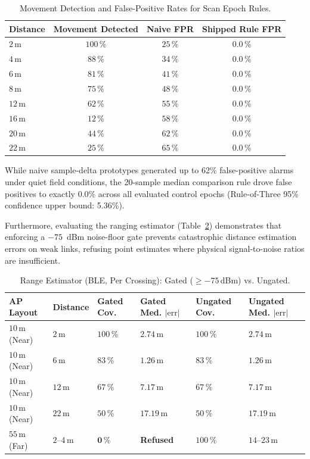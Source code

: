 \documentclass[journal,10pt]{IEEEtran}
\begin{document}
\begin{table}[htb!]
  \centering
  \caption{Movement Detection and False-Positive Rates for Scan Epoch Rules.}
  \label{tab:epoch}
  \footnotesize
  \begin{tabular}{@{}lccc@{}}
    \toprule
    Distance & Movement Detected & Naive FPR & Shipped Rule FPR \\
    \midrule
    $2$\,m  & $100\,\%$ & $25\,\%$ & $\mathbf{0.0\,\%}$ \\
    $4$\,m  & $88\,\%$  & $34\,\%$ & $\mathbf{0.0\,\%}$ \\
    $6$\,m  & $81\,\%$  & $41\,\%$ & $\mathbf{0.0\,\%}$ \\
    $8$\,m  & $75\,\%$  & $48\,\%$ & $\mathbf{0.0\,\%}$ \\
    $12$\,m & $62\,\%$  & $55\,\%$ & $\mathbf{0.0\,\%}$ \\
    $16$\,m & $12\,\%$  & $58\,\%$ & $\mathbf{0.0\,\%}$ \\
    $20$\,m & $44\,\%$  & $62\,\%$ & $\mathbf{0.0\,\%}$ \\
    $22$\,m & $25\,\%$  & $65\,\%$ & $\mathbf{0.0\,\%}$ \\
    \bottomrule
  \end{tabular}
\end{table}

While naive sample-delta prototypes generated up to 62\% false-positive alarms under quiet field conditions, the 20-sample median comparison rule drove false positives to exactly 0.0\% across all evaluated control epochs (Rule-of-Three 95\% confidence upper bound: 5.36\%).

Furthermore, evaluating the ranging estimator (Table~\ref{tab:range_estimator}) demonstrates that enforcing a $-75$~dBm noise-floor gate prevents catastrophic distance estimation errors on weak links, refusing point estimates where physical signal-to-noise ratios are insufficient.

\begin{table}[htb!]
  \centering
  \caption{Range Estimator (BLE, Per Crossing): Gated ($\ge -75$\,dBm) vs. Ungated.}
  \label{tab:range_estimator}
  \footnotesize
  \begin{tabular}{@{}p{1.4cm}p{1.0cm}p{1.0cm}p{1.0cm}p{1.0cm}p{1.0cm}@{}}
    \toprule
    \textbf{AP Layout} & \textbf{Distance} & \textbf{Gated Cov.} & \textbf{Gated Med. $|\mathrm{err}|$} & \textbf{Ungated Cov.} & \textbf{Ungated Med. $|\mathrm{err}|$} \\
    \midrule
    $10$\,m (Near) & $2$\,m  & $100\,\%$ & $2.74$\,m  & $100\,\%$ & $2.74$\,m  \\
    $10$\,m (Near) & $6$\,m  & $83\,\%$  & $1.26$\,m  & $83\,\%$  & $1.26$\,m  \\
    $10$\,m (Near) & $12$\,m & $67\,\%$  & $7.17$\,m  & $67\,\%$  & $7.17$\,m  \\
    $10$\,m (Near) & $22$\,m & $50\,\%$  & $17.19$\,m & $50\,\%$  & $17.19$\,m \\
    $55$\,m (Far)  & $2$--$4$\,m & $\mathbf{0\,\%}$ & \textbf{Refused} & $100\,\%$ & $14$--$23$\,m \\
    \bottomrule
  \end{tabular}
\end{table}
\end{document}
